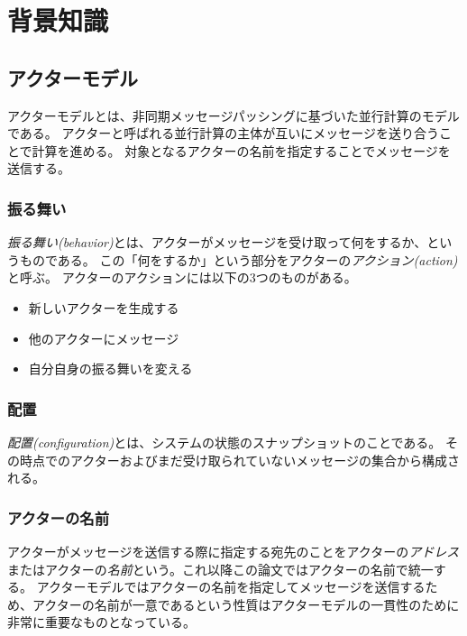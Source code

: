 \chapter{背景知識}

\section{アクターモデル}

アクターモデル\cite{}とは、非同期メッセージパッシングに基づいた並行計算のモデルである。
アクターと呼ばれる並行計算の主体が互いにメッセージを送り合うことで計算を進める。
対象となるアクターの名前を指定することでメッセージを送信する。


\subsection{振る舞い}

\emph{振る舞い(behavior)}とは、アクターがメッセージを受け取って何をするか、というものである。
この「何をするか」という部分をアクターの\emph{アクション(action)}と呼ぶ。
アクターのアクションには以下の3つのものがある。

\begin{itemize}
\item 新しいアクターを生成する
\item 他のアクターにメッセージ
\item 自分自身の振る舞いを変える
\end{itemize}


\subsection{配置}

\emph{配置(configuration)}とは、システムの状態のスナップショットのことである。
その時点でのアクターおよびまだ受け取られていないメッセージの集合から構成される。

\subsection{アクターの名前}

アクターがメッセージを送信する際に指定する宛先のことをアクターの\emph{アドレス}またはアクターの\emph{名前}という。これ以降この論文ではアクターの名前で統一する。
アクターモデルではアクターの名前を指定してメッセージを送信するため、アクターの名前が一意であるという性質はアクターモデルの一貫性のために非常に重要なものとなっている。

\subsection{\fairness}

